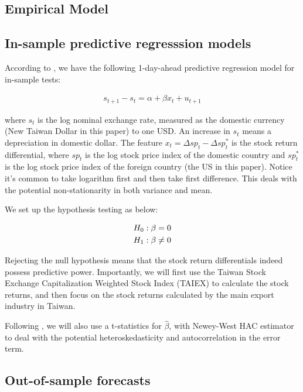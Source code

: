 \documentclass[]{AEA}
\begin{document}
\begin{spacing}{2.0}
\section{Empirical Model}

\subsection{In-sample predictive regresssion models}



According to \cite{chen2019stock}, we have the following 1-day-ahead predictive regression model for in-sample tests:

\begin{align}
s_{t+1}-s_t=\alpha+\beta x_t+u_{t+1}
\label{e1}
\end{align}

where $s_t$ is the log nominal exchange rate, measured as the domestic currency (New Taiwan Dollar in this paper) to one USD. An increase in $s_t$ means a depreciation in domestic dollar. The feature $x_t=\Delta sp_t -\Delta sp^*_t$ is the stock return differential, where $sp_t$ is the log stock price index of the domestic country and $sp^*_t$ is the log stock price index of the foreign country (the US in this paper). Notice it's common to take logarithm first and then take first difference. This deals with the potential non-stationarity in both variance and mean.

We set up the hypothesis testing as below:

\begin{align}
H_0 &:\beta=0 \notag \\
H_1 &:\beta\ne 0 \notag 
\end{align}

Rejecting the null hypothesis means that the stock return differentials indeed possess predictive power. Importantly, we will first use the Taiwan Stock Exchange Capitalization Weighted Stock Index (TAIEX) to calculate the stock returns, and then focus on the stock returns calculated by the main export industry in Taiwan.

Following \cite{chen2019stock}, we will also use a t-statistics for $\hat \beta$, with Newey-West HAC estimator to deal with the potential heteroskedasticity and autocorrelation in the error term.

\subsection{Out-of-sample forecasts}


\end{spacing}
\end{document}
